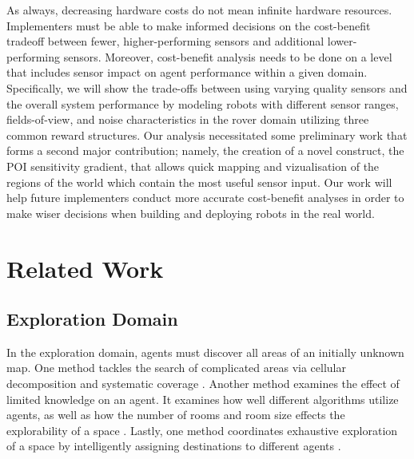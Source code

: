 \documentclass[letterpaper, 10 pt, conference]{ieeeconf}  %
\begin{document}
As always, decreasing hardware costs do not mean infinite hardware resources.
Implementers must be able to make informed decisions on the cost-benefit tradeoff 
between fewer, higher-performing sensors and additional lower-performing sensors. Moreover, cost-benefit analysis needs to be done on a level that includes sensor impact on  agent performance within a given domain. Specifically, we will show the trade-offs between using varying quality sensors and the overall system performance by modeling robots with different sensor ranges, fields-of-view, and noise characteristics in the rover domain utilizing three common reward structures. Our analysis necessitated some preliminary work that forms a second major contribution; namely, the creation of a novel construct, the POI sensitivity gradient, that allows
quick mapping and vizualisation of the regions of the world which
contain the most useful sensor input.  Our work will help future implementers conduct more accurate cost-benefit analyses in order to make wiser decisions when building and deploying robots in the real world.


\section{Related Work}
\subsection{Exploration Domain}
In the exploration domain, agents must discover all areas of an
initially unknown map. One method tackles the search of complicated
areas via cellular decomposition and systematic coverage \cite{choset2001coverage}. Another
method examines the effect of limited knowledge on an agent. It
examines how well different algorithms utilize agents, as well as how
the number of rooms and room size effects the explorability of a space
\cite{ferranti2007brick}. Lastly, one method coordinates exhaustive exploration of a space
by intelligently assigning destinations to different agents \cite{burgard2005coordinated}.
\end{document}
